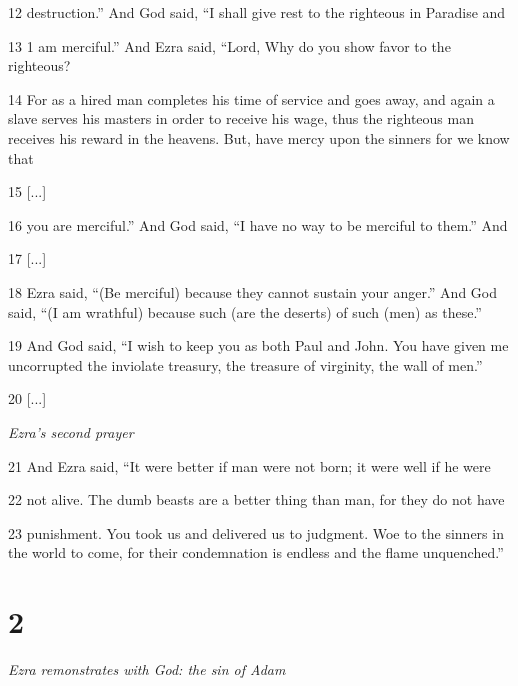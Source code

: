 \par 12 destruction.” And God said, “I shall give rest to the righteous in Paradise and

\par 13 1 am merciful.” And Ezra said, “Lord, Why do you show favor to the righteous?

\par 14 For as a hired man completes his time of service and goes away, and again a slave serves his masters in order to receive his wage, thus the righteous man receives his reward in the heavens. But, have mercy upon the sinners for we know that

\par 15 [...]

\par 16 you are merciful.” And God said, “I have no way to be merciful to them.” And

\par 17 [...]

\par 18 Ezra said, “(Be merciful) because they cannot sustain your anger.” And God said, “(I am wrathful) because such (are the deserts) of such (men) as these.”

\par 19 And God said, “I wish to keep you as both Paul and John. You have given me uncorrupted the inviolate treasury, the treasure of virginity, the wall of men.”

\par 20 [...]

\par \textit{Ezra's second prayer}

\par 21 And Ezra said, “It were better if man were not born; it were well if he were

\par 22 not alive. The dumb beasts are a better thing than man, for they do not have

\par 23 punishment. You took us and delivered us to judgment. Woe to the sinners in the world to come, for their condemnation is endless and the flame unquenched.”

\chapter{2}

\par \textit{Ezra remonstrates with God: the sin of Adam}

